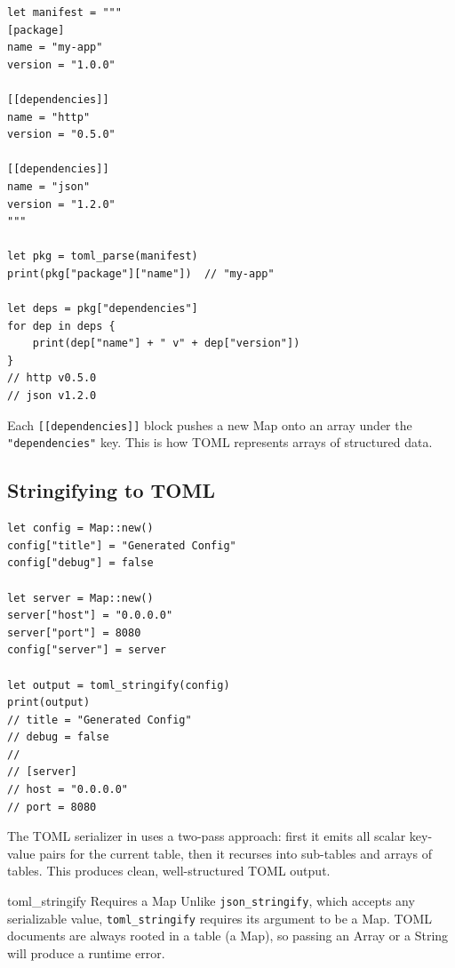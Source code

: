 \begin{lstlisting}[language=Lattice, caption={TOML array of tables}]
let manifest = """
[package]
name = "my-app"
version = "1.0.0"

[[dependencies]]
name = "http"
version = "0.5.0"

[[dependencies]]
name = "json"
version = "1.2.0"
"""

let pkg = toml_parse(manifest)
print(pkg["package"]["name"])  // "my-app"

let deps = pkg["dependencies"]
for dep in deps {
    print(dep["name"] + " v" + dep["version"])
}
// http v0.5.0
// json v1.2.0
\end{lstlisting}

Each \texttt{[[dependencies]]} block pushes a new Map onto an array under the
\texttt{"dependencies"} key. This is how TOML represents arrays of structured
data.

\subsection{Stringifying to TOML}

\begin{lstlisting}[language=Lattice, caption={Generating TOML from Lattice values}]
let config = Map::new()
config["title"] = "Generated Config"
config["debug"] = false

let server = Map::new()
server["host"] = "0.0.0.0"
server["port"] = 8080
config["server"] = server

let output = toml_stringify(config)
print(output)
// title = "Generated Config"
// debug = false
//
// [server]
// host = "0.0.0.0"
// port = 8080
\end{lstlisting}

The TOML serializer in  uses a two-pass approach:
first it emits all scalar key-value pairs for the current table, then it
recurses into sub-tables and arrays of tables. This produces clean,
well-structured TOML output.

\begin{warnbox}{toml\_stringify Requires a Map}
Unlike \lstinline|json_stringify|, which accepts any serializable value,
\lstinline|toml_stringify| requires its argument to be a Map. TOML documents
are always rooted in a table (a Map), so passing an Array or a String will
produce a runtime error.
\end{warnbox}


